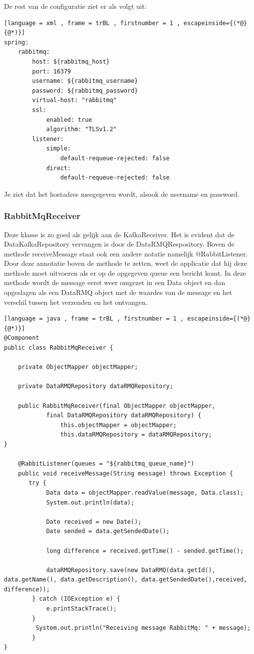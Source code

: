 De rest van de configuratie ziet er als volgt uit: 
\begin{lstlisting}[language = xml , frame = trBL , firstnumber = 1 , escapeinside={(*@}{@*)}]
spring:
    rabbitmq:
        host: ${rabbitmq_host}
        port: 16379
        username: ${rabbitmq_username}
        password: ${rabbitmq_password}
        virtual-host: "rabbitmq"
        ssl:
            enabled: true
            algorithm: "TLSv1.2"
        listener:
            simple:
                default-requeue-rejected: false
            direct:
                default-requeue-rejected: false
\end{lstlisting}

Je ziet dat het hostadres meegegeven wordt, alsook de username en password.
\subsubsection{RabbitMqReceiver}
Deze klasse is zo goed als gelijk aan de KafkaReceiver. Het is evident dat de DataKafkaRepository vervangen is door de DataRMQRespository. Boven de methode receiveMessage staat ook een andere notatie namelijk @RabbitListener. Door deze annotatie boven de methode te zetten, weet de applicatie dat hij deze methode moet uitvoeren als er op de opgegeven queue een bericht komt. In deze methode wordt de message eerst weer omgezet in een Data object en dan opgeslagen als een DataRMQ object met de waardes van de message en het verschil tussen het verzenden en het ontvangen.
\begin{lstlisting}[language = java , frame = trBL , firstnumber = 1 , escapeinside={(*@}{@*)}]
@Component
public class RabbitMqReceiver {

    private ObjectMapper objectMapper;

    private DataRMQRepository dataRMQRepository;

    public RabbitMqReceiver(final ObjectMapper objectMapper,
            final DataRMQRepository dataRMQRepository) {
                this.objectMapper = objectMapper;
                this.dataRMQRepository = dataRMQRepository;
}

    @RabbitListener(queues = "${rabbitmq_queue_name}")
    public void receiveMessage(String message) throws Exception {
       try {
            Data data = objectMapper.readValue(message, Data.class);
            System.out.println(data);

            Date received = new Date();
            Date sended = data.getSendedDate();

            long difference = received.getTime() - sended.getTime();

            dataRMQRepository.save(new DataRMQ(data.getId(), data.getName(), data.getDescription(), data.getSendedDate(),received, difference));
        } catch (IOException e) {
            e.printStackTrace();
        }
         System.out.println("Receiving message RabbitMq: " + message);
        }
}
\end{lstlisting}
